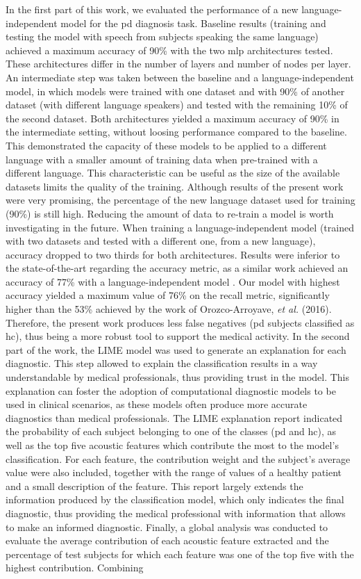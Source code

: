 In the first part of this work, we evaluated the performance of a new language-independent model for the \gls{pd} diagnosis task. Baseline results (training and testing the model with speech from subjects speaking the same language) achieved a maximum accuracy of 90\% with the two \gls{mlp} architectures tested. These architectures differ in the number of layers and number of nodes per layer. An intermediate step was taken between the baseline and a language-independent model, in which models were trained with one dataset and with 90\% of another dataset (with different language speakers) and tested with the remaining 10\% of the second dataset. Both architectures yielded a maximum accuracy of 90\% in the intermediate setting, without loosing performance compared to the baseline. This demonstrated the capacity of these models to be applied to a different language with a smaller amount of training data when pre-trained with a different language. This characteristic can be useful as the size of the available datasets limits the quality of the training. Although results of the present work were very promising, the percentage of the new language dataset used for training (90\%) is still high. Reducing the amount of data to re-train a model is worth investigating in the future. When training a language-independent model (trained with two datasets and tested with a different one, from a new language), accuracy dropped to two thirds for both architectures. Results were inferior to the state-of-the-art regarding the accuracy metric, as a similar work achieved an accuracy of 77\% with a language-independent model \cite{parkinson_three_languages}. Our model with highest accuracy yielded a maximum value of 76\% on the recall metric, significantly higher than the 53\% achieved by the work of Orozco-Arroyave, \textit{et al.} (2016). Therefore, the present work produces less false negatives (\gls{pd} subjects classified as \gls{hc}), thus being a more robust tool to support the medical activity. In the second part of the work, the LIME model was used to generate an explanation for each diagnostic. This step allowed to explain the classification results in a way understandable by medical professionals, thus providing trust in the model. This explanation can foster the adoption of computational diagnostic models to be used in clinical scenarios, as these models often produce more accurate diagnostics than medical professionals. The LIME explanation report indicated the probability of each subject belonging to one of the classes (\gls{pd} and \gls{hc}), as well as the top five acoustic features which contribute the most to the model's classification. For each feature, the contribution weight and the subject's average value were also included, together with the range of values of a healthy patient and a small description of the feature. This report largely extends the information produced by the classification model, which only indicates the final diagnostic, thus providing the medical professional with information that allows to make an informed diagnostic. Finally, a global analysis was conducted to evaluate the average contribution of each acoustic feature extracted and the percentage of test subjects for which each feature was one of the top five with the highest contribution. Combining 
